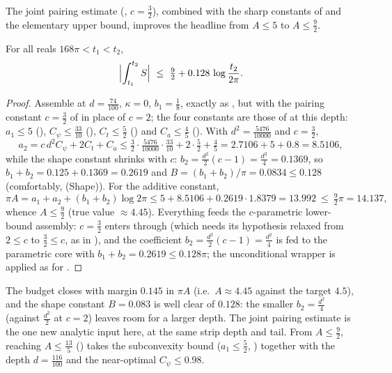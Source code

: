 The joint pairing estimate (, $c=\tfrac32$), combined with
the sharp constants of  and the elementary upper bound, improves the
headline from $A\le5$ to $A\le\tfrac92$.

\begin{theorem}
\label{thm:ls_ninehalves}
For all reals $168\pi<t_1<t_2$,
\[
  \Bigl|\int_{t_1}^{t_2}S\Bigr|\ \le\ \tfrac92+0.128\,\log\frac{t_2}{2\pi}.
\]
\end{theorem}

\begin{proof}
Assemble at $d=\tfrac{74}{100}$, $\kappa=0$, $b_1=\tfrac18$, exactly as
, but with the pairing constant $c=\tfrac32$ of
 in place of $c=2$; the four constants are those of
 at this depth:
$a_1\le5$ (), $C_\psi\le\tfrac{33}{10}$
(), $C_t\le\tfrac52$ () and $C_a\le\tfrac45$
(). With $d^2=\tfrac{5476}{10000}$ and $c=\tfrac32$,
\[
  a_2=c\,d^2C_\psi+2C_t+C_a
     \le\tfrac32\cdot\tfrac{5476}{10000}\cdot\tfrac{33}{10}+2\cdot\tfrac52+\tfrac45
     =2.7106+5+0.8=8.5106 ,
\]
while the shape constant shrinks with $c$: $b_2=\tfrac{d^2}2(c-1)=\tfrac{d^2}4=0.1369$,
so $b_1+b_2=0.125+0.1369=0.2619$ and $B=(b_1+b_2)/\pi=0.0834\le0.128$ (comfortably,
\textup{(Shape)}). For the additive constant,
\[
  \pi A=a_1+a_2+(b_1+b_2)\log2\pi\le5+8.5106+0.2619\cdot1.8379=13.992
       \ \le\ \tfrac92\pi=14.137 ,
\]
whence $A\le\tfrac92$ (true value $\approx4.45$). Everything feeds the
$c$-parametric lower-bound assembly: $c=\tfrac32$ enters through
 (which needs its hypothesis relaxed from
$2\le c$ to $\tfrac32\le c$, as in ), and the
coefficient $b_2=\tfrac{d^2}2(c-1)=\tfrac{d^2}4$ is fed to the parametric
core  with
$b_1+b_2=0.2619\le0.128\pi$; the unconditional wrapper is applied as for
.
\end{proof}

\begin{remark}[Margins]
\label{rem:ls_ninehalves}
The budget closes with margin $0.145$ in $\pi A$ (i.e.\ $A\approx4.45$ against the
target $4.5$), and the shape constant $B=0.083$ is well clear of $0.128$: the smaller
$b_2=\tfrac{d^2}4$ (against $\tfrac{d^2}2$ at $c=2$) leaves room for a larger depth. The
joint pairing estimate is the one new analytic input here, at the same strip depth and
tail. From $A\le\tfrac92$, reaching $A\le\tfrac{13}5$ ()
takes the subconvexity bound ($a_1\le\tfrac52$, )
together with the depth $d=\tfrac{116}{100}$ and the near-optimal $C_\psi\le0.98$.
\end{remark}

